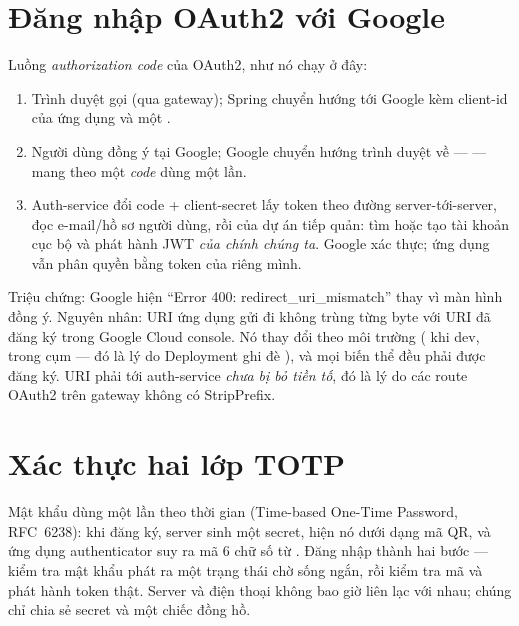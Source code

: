 \section{Đăng nhập OAuth2 với Google}

Luồng \emph{authorization code} của OAuth2, như nó chạy ở đây:

\begin{enumerate}
  \item Trình duyệt gọi  (qua
  gateway); Spring chuyển hướng tới Google kèm client-id của ứng dụng và
  một .
  \item Người dùng đồng ý tại Google; Google chuyển hướng trình duyệt về
   ---  --- mang theo
  một \emph{code} dùng một lần.
  \item Auth-service đổi code + client-secret lấy token theo đường
  server-tới-server, đọc e-mail/hồ sơ người dùng, rồi
   của dự án tiếp quản: tìm hoặc tạo tài
  khoản cục bộ và phát hành JWT \emph{của chính chúng ta}. Google xác
  thực; ứng dụng vẫn phân quyền bằng token của riêng mình.
\end{enumerate}

\begin{pitfall}
Triệu chứng: Google hiện ``Error 400: redirect\_uri\_mismatch'' thay vì
màn hình đồng ý. Nguyên nhân: URI ứng dụng gửi đi không trùng từng byte
với URI đã đăng ký trong Google Cloud console. Nó thay đổi theo môi
trường ( khi dev,  trong cụm --- đó
là lý do Deployment ghi đè ), và mọi
biến thể đều phải được đăng ký. URI phải tới auth-service \emph{chưa bị
bỏ tiền tố}, đó là lý do các route OAuth2 trên gateway không có
StripPrefix.
\end{pitfall}

\section{Xác thực hai lớp TOTP}

Mật khẩu dùng một lần theo thời gian (Time-based One-Time Password,
RFC~6238): khi đăng ký, server sinh một secret, hiện nó dưới dạng mã QR,
và ứng dụng authenticator suy ra mã 6 chữ số từ
. Đăng nhập thành hai bước --- kiểm tra mật
khẩu phát ra một trạng thái chờ sống ngắn, rồi  kiểm
tra mã và phát hành token thật. Server và điện thoại không bao giờ liên
lạc với nhau; chúng chỉ chia sẻ secret và một chiếc đồng hồ.

